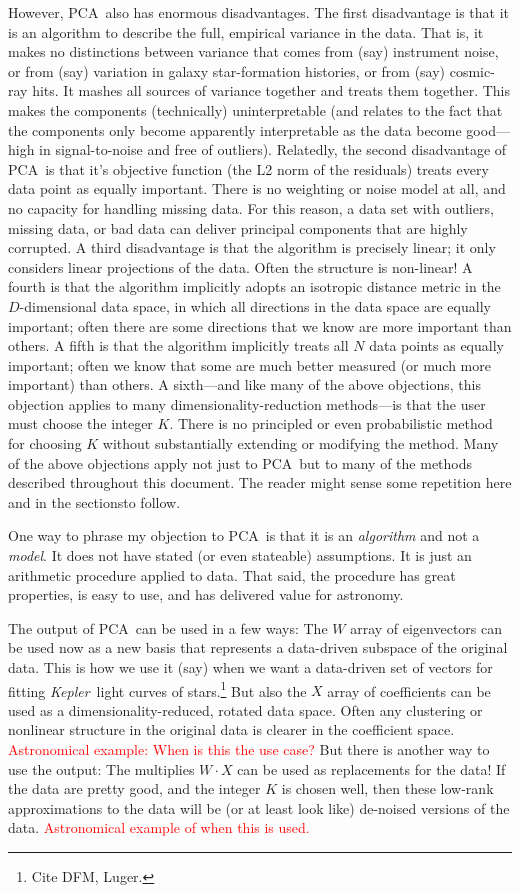 \documentclass[12pt, twoside, letterpaper]{article}
\newcommand{\sectionnames}{sections}
\newcommand{\acronym}[1]{{\small{#1}}}
\newcommand{\PCA}{\acronym{PCA}}
\newcommand{\project}[1]{\textsl{#1}}
\newcommand{\Kepler}{\project{Kepler}}
\newcommand{\todo}[1]{\textcolor{red}{#1}}  %
\begin{document}
However, \PCA\ also has enormous disadvantages.
The first disadvantage is that it is an algorithm to describe the full,
empirical variance in the data.
That is, it makes no distinctions between variance that comes from (say)
instrument noise, or from (say) variation in galaxy star-formation histories,
or from (say) cosmic-ray hits.
It mashes all sources of variance together and treats them together.
This makes the components (technically) uninterpretable (and relates to the
fact that the components only become apparently interpretable as the data become good---high
in signal-to-noise and free of outliers).
Relatedly, the second disadvantage of \PCA\ is that it's objective function
(the L2 norm of the residuals) treats every data point
as equally important.
There is no weighting or noise model at all, and no capacity for handling
missing data.
For this reason, a data set with outliers, missing data, or bad data can deliver
principal components that are highly corrupted.
A third disadvantage is that the algorithm is precisely linear; it only
considers linear projections of the data.
Often the structure is non-linear!
A fourth is that the algorithm implicitly adopts an isotropic distance metric
in the $D$-dimensional data space, 
in which all directions in the data space are equally important; often there
are some directions that we know are more important than others.
A fifth is that the algorithm implicitly treats all $N$ data points as equally
important; often we know that some are much better measured (or much more important)
than others.
A sixth---and like many of the above objections, this objection applies to
many dimensionality-reduction methods---is that the user must choose the integer
$K$.
There is no principled or even probabilistic method for choosing $K$ without
substantially extending or modifying the method.
Many of the above objections apply not just to \PCA\ but to many of the methods
described throughout this document.
The reader might sense some repetition here and in the \sectionnames to follow.

One way to phrase my objection to \PCA\ is that it is an \emph{algorithm}
and not a \emph{model}.
It does not have stated (or even stateable) assumptions.
It is just an arithmetic procedure applied to data.
That said, the procedure has great properties, is easy to use, and has
delivered value for astronomy.

The output of \PCA\ can be used in a few ways:
The $W$ array of eigenvectors can be used now as a new basis that represents a
data-driven subspace of the original data.
This is how we use it (say) when we want a data-driven set of vectors for fitting
\Kepler\ light curves of stars.\footnote{Cite DFM, Luger.}
But also the $X$ array of coefficients can be used as a dimensionality-reduced,
rotated data space.
Often any clustering or nonlinear structure in the original data is clearer in
the coefficient space.
\todo{Astronomical example: When is this the use case?}
But there is another way to use the output:
The multiplies $W\cdot X$ can be used as replacements for the data!
If the data are pretty good, and the integer $K$ is chosen well, then these
low-rank approximations to the data will be (or at least look like) de-noised
versions of the data.
\todo{Astronomical example of when this is used.}
\end{document}
